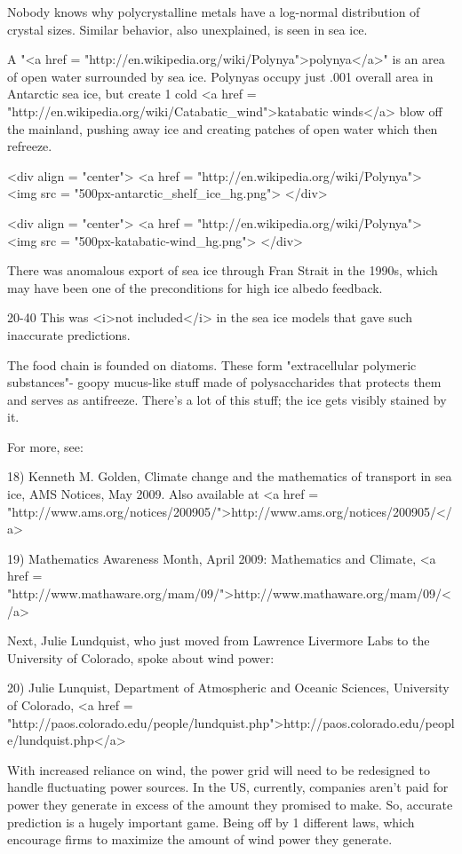 Nobody knows why polycrystalline metals have a log-normal distribution
of crystal sizes.  Similar behavior, also unexplained, is seen in sea
ice.

A "<a href =
"http://en.wikipedia.org/wiki/Polynya">polynya</a>" is an area of
open water surrounded by sea ice.  Polynyas occupy just .001%
overall area in Antarctic sea ice, but create 1%
cold <a href = "http://en.wikipedia.org/wiki/Catabatic_wind">katabatic
winds</a> blow off the mainland, pushing away ice and creating patches
of open water which then refreeze.

<div align = "center">
<a href = "http://en.wikipedia.org/wiki/Polynya">
<img src = "500px-antarctic_shelf_ice_hg.png">
</div>

<div align = "center">
<a href = "http://en.wikipedia.org/wiki/Polynya">
<img src = "500px-katabatic-wind_hg.png">
</div>

There was anomalous export of sea ice through Fran Strait in the 1990s,
which may have been one of the preconditions for high ice albedo feedback.

20-40%
This was <i>not included</i> in the sea ice models that gave such
inaccurate predictions.

The food chain is founded on diatoms.  These form "extracellular
polymeric substances"- goopy mucus-like stuff made of polysaccharides
that protects them and serves as antifreeze.  There's a lot of this
stuff; the ice gets visibly stained by it.

For more, see:

18) Kenneth M. Golden, Climate change and the mathematics of transport
in sea ice, AMS Notices, May 2009.  Also available at
<a href = "http://www.ams.org/notices/200905/">http://www.ams.org/notices/200905/</a>

19) Mathematics Awareness Month, April 2009: Mathematics and Climate,
<a href = "http://www.mathaware.org/mam/09/">http://www.mathaware.org/mam/09/</a>

Next, Julie Lundquist, who just moved from Lawrence Livermore Labs
to the University of Colorado, spoke about wind power:

20) Julie Lunquist, Department of Atmospheric and Oceanic Sciences,
University of Colorado, <a href = "http://paos.colorado.edu/people/lundquist.php">http://paos.colorado.edu/people/lundquist.php</a>

With increased reliance on wind, the power grid will need to be
redesigned to handle fluctuating power sources.  In the US, currently,
companies aren't paid for power they generate in excess of the amount
they promised to make.  So, accurate prediction is a hugely important
game.  Being off by 1%
different laws, which encourage firms to maximize the amount of wind
power they generate.

